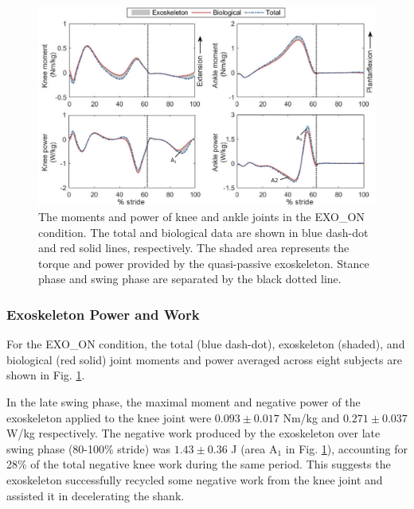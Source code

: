 \documentclass[twocolumn,cleanfoot,10pt]{asme2ej}
\begin{document}
\begin{figure}[t]
	\centering
	\includegraphics[width=17cm]{exo.eps}
	\caption{The moments and power of knee and ankle joints in the EXO\_ON condition.
	The total and biological data are shown in blue dash-dot and red solid lines, respectively.
	The shaded area represents the torque and power provided by the quasi-passive exoskeleton.
	Stance phase and swing phase are separated by the black dotted line.}
	\label{fig:exo}
\end{figure}

\subsubsection{Exoskeleton Power and Work}
For the EXO\_ON condition, the total (blue dash-dot), exoskeleton (shaded), and biological (red solid) joint moments and power averaged across eight subjects are shown in Fig. \ref{fig:exo}.

In the late swing phase, the maximal moment and negative power of the exoskeleton applied to the knee joint were $0.093\pm0.017$ Nm/kg and $0.271\pm0.037$ W/kg respectively.
The negative work produced by the exoskeleton over late swing phase (80-100\% stride) was $1.43\pm0.36$ J (area A$_{1}$ in Fig. \ref{fig:exo}), accounting for 28\% of the total negative knee work during the same period.
This suggests the exoskeleton successfully recycled some negative work from the knee joint and assisted it in decelerating the shank.
\end{document}
